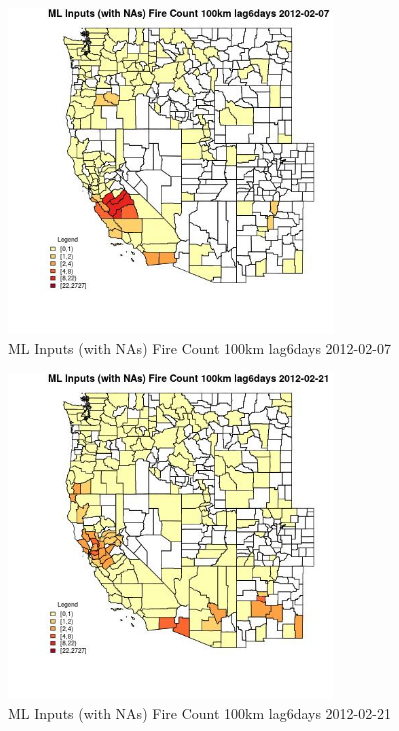 \begin{figure} 
\centering  
\includegraphics[width=0.77\textwidth]{Code_Outputs/Report_ML_input_PM25_Step4_part_f_de_duplicated_aveswNAs_CountyFire_Count_100km_lag6daysMean2012-02-07.jpg} 
\caption{\label{fig:Report_ML_input_PM25_Step4_part_f_de_duplicated_aveswNAsCountyFire_Count_100km_lag6daysMean2012-02-07}ML Inputs (with NAs) Fire Count 100km lag6days 2012-02-07} 
\end{figure} 
 

\begin{figure} 
\centering  
\includegraphics[width=0.77\textwidth]{Code_Outputs/Report_ML_input_PM25_Step4_part_f_de_duplicated_aveswNAs_CountyFire_Count_100km_lag6daysMean2012-02-21.jpg} 
\caption{\label{fig:Report_ML_input_PM25_Step4_part_f_de_duplicated_aveswNAsCountyFire_Count_100km_lag6daysMean2012-02-21}ML Inputs (with NAs) Fire Count 100km lag6days 2012-02-21} 
\end{figure} 
 

